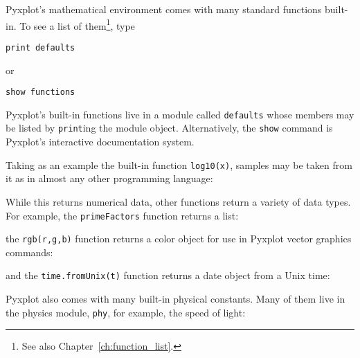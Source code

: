 Pyxplot's mathematical environment comes with many standard functions built-in.
To see a list of them\footnote{See also Chapter~\ref{ch:function_list}.}, type

\begin{verbatim}
print defaults
\end{verbatim}

\noindent or

\begin{verbatim}
show functions
\end{verbatim}

\noindent Pyxplot's built-in functions live in a module called {\tt defaults}
whose members may be listed by {\tt print}ing the module object. Alternatively,
the {\tt show} command is Pyxplot's interactive documentation system.

Taking as an example the built-in function {\tt log10(x)}, samples may be taken
from it as in almost any other programming language:

\vspace{3mm}

\vspace{3mm}

\noindent While this returns numerical data, other functions return a variety
of data types. For example, the {\tt primeFactors} function returns a list:

\vspace{3mm}

\vspace{3mm}

\noindent the {\tt rgb(r,g,b)} function returns a color object for use in
Pyxplot vector graphics commands:

\vspace{3mm}

\vspace{3mm}

\noindent and the {\tt time.fromUnix(t)} function returns a date object from a
Unix time:

\vspace{3mm}

\vspace{3mm}

Pyxplot also comes with many built-in physical constants. Many of them live in
the physics module, {\tt phy}, for example, the speed of light:

\vspace{3mm}

\vspace{3mm}

